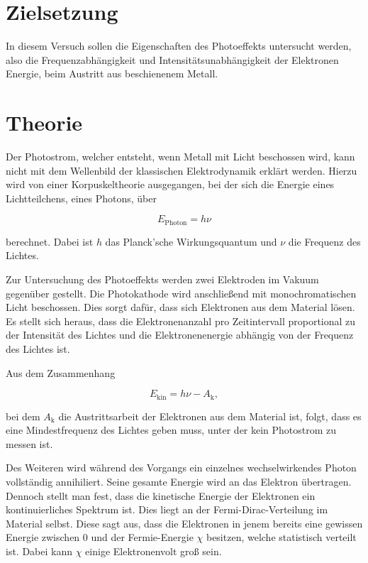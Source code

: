 \section{Zielsetzung}

In diesem Versuch sollen die Eigenschaften des Photoeffekts untersucht werden,
also die Frequenzabhängigkeit und Intensitätsunabhängigkeit der Elektronen Energie,
beim Austritt aus beschienenem Metall.

\section{Theorie}
\label{sec:Theorie}

Der Photostrom, welcher entsteht, wenn Metall mit Licht beschossen wird, kann nicht mit dem Wellenbild der klassischen Elektrodynamik erklärt werden.
Hierzu wird von einer Korpuskeltheorie ausgegangen, bei der sich die Energie eines Lichtteilchens, eines Photons, über

\begin{equation}
    \label{eqn:photon-energie}
    E_\text{Photon} = h \nu
\end{equation}

berechnet. Dabei ist $h$ das Planck'sche Wirkungsquantum und $\nu$ die Frequenz des Lichtes.

Zur Untersuchung des Photoeffekts werden zwei Elektroden im Vakuum gegenüber gestellt.
Die Photokathode wird anschließend mit monochromatischen Licht beschossen.
Dies sorgt dafür, dass sich Elektronen aus dem Material lösen.
Es stellt sich heraus, dass die Elektronenanzahl pro Zeitintervall proportional zu der Intensität des Lichtes und die Elektronenenergie abhängig von der Frequenz des Lichtes ist.

Aus dem Zusammenhang

\begin{equation}
    \label{eqn:elek-energie}
    E_\text{kin} = h \nu - A_\text{k},
\end{equation}

bei dem $A_\text{k}$ die Austrittsarbeit der Elektronen aus dem Material ist,
folgt, dass es eine Mindestfrequenz des Lichtes geben muss, unter der kein Photostrom zu messen ist.

Des Weiteren wird während des Vorgangs ein einzelnes wechselwirkendes Photon vollständig annihiliert.
Seine gesamte Energie wird an das Elektron übertragen.
Dennoch stellt man fest, dass die kinetische Energie der Elektronen ein kontinuierliches Spektrum ist.
Dies liegt an der Fermi-Dirac-Verteilung im Material selbst. Diese sagt aus,
dass die Elektronen in jenem bereits eine gewissen Energie zwischen $0$ und der Fermie-Energie $\chi$ besitzen,
welche statistisch verteilt ist. Dabei kann $\chi$ einige Elektronenvolt groß sein.


